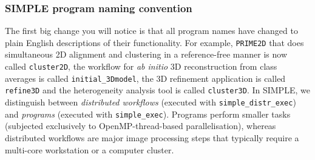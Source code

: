 \documentclass[a4paper,11pt]{article}
\newcommand{\prgname}[1]{\textcolor{NavyBlue}{\texttt{#1}}}
\begin{document}
\subsubsection{SIMPLE program naming convention}
The first big change you will notice is that all program names have changed to plain English descriptions of their functionality.  For example, \prgname{PRIME2D} that does simultaneous 2D alignment and clustering in a reference-free manner is now called \prgname{cluster2D}, the workflow for \textit{ab initio} 3D reconstruction from class averages is called \prgname{initial\_3Dmodel}, the 3D refinement application is called \prgname{refine3D} and the heterogeneity analysis tool is called \prgname{cluster3D}. In SIMPLE, we distinguish between \textit{distributed workflows} (executed with \texttt{simple\_distr\_exec}) and \textit{programs} (executed with \texttt{simple\_exec}). Programs perform smaller tasks (subjected exclusively to OpenMP-thread-based parallelisation), whereas distributed workflows are major image processing steps that typically require a multi-core workstation or a computer cluster. 
\end{document}
